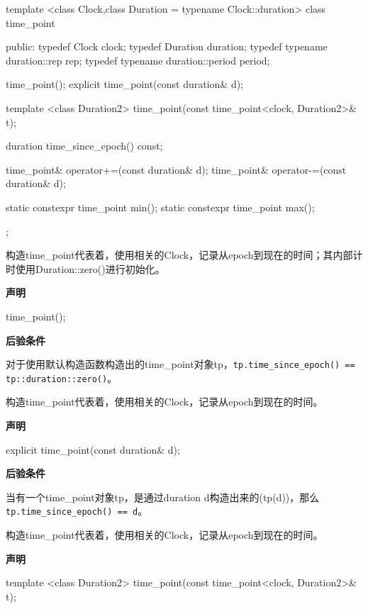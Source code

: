 \begin{cpp}
template <class Clock,class Duration = typename Clock::duration>
class time_point
{
public:
  typedef Clock clock;
  typedef Duration duration;
  typedef typename duration::rep rep;
  typedef typename duration::period period;

  time_point();
  explicit time_point(const duration& d);

  template <class Duration2>
  time_point(const time_point<clock, Duration2>& t);

  duration time_since_epoch() const;

  time_point& operator+=(const duration& d);
  time_point& operator-=(const duration& d);

  static constexpr time_point min();
  static constexpr time_point max();
};
\end{cpp}


构造time\_point代表着，使用相关的Clock，记录从epoch到现在的时间；其内部计时使用Duration::zero()进行初始化。

\textbf{声明}

\begin{cpp}
time_point();
\end{cpp}

\textbf{后验条件}

对于使用默认构造函数构造出的time\_point对象tp，\texttt{tp.time\_since\_epoch() == tp::duration::zero()}。


构造time\_point代表着，使用相关的Clock，记录从epoch到现在的时间。

\textbf{声明}

\begin{cpp}
explicit time_point(const duration& d);
\end{cpp}

\textbf{后验条件}

当有一个time\_point对象tp，是通过duration d构造出来的(tp(d))，那么\texttt{tp.time\_since\_epoch() == d}。


构造time\_point代表着，使用相关的Clock，记录从epoch到现在的时间。

\textbf{声明}

\begin{cpp}
template <class Duration2>
time_point(const time_point<clock, Duration2>& t);
\end{cpp}

